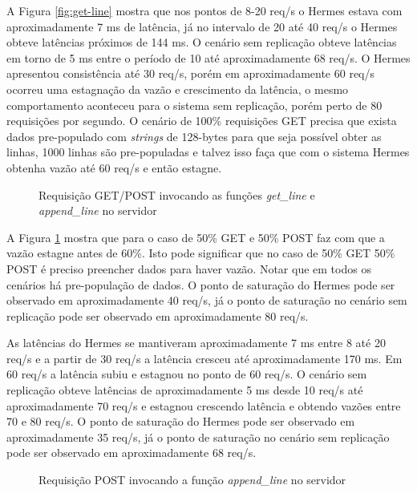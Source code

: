 \documentclass[12pt]{article}
\begin{document}
A Figura \ref{fig:get-line} mostra que nos pontos de 8-20 req/s o Hermes estava com aproximadamente 7 ms de latência, já no intervalo de 20 até 40 req/s o Hermes obteve latências próximos de 144 ms. O cenário sem replicação obteve latências em torno de 5 ms entre o período de 10 até aproximadamente 68 req/s. O Hermes apresentou consistência até 30 req/s, porém em aproximadamente 60 req/s ocorreu uma estagnação da vazão e crescimento da latência, o mesmo comportamento aconteceu para o sistema sem replicação, porém perto de 80 requisições por segundo. O cenário de 100\% requisições GET precisa que exista dados pre-populado com \textit{strings} de 128-bytes para que seja possível obter as linhas, 1000 linhas são pre-populadas e talvez isso faça que com o sistema Hermes obtenha vazão até 60 req/s e então estagne.

\begin{figure}[htb!]
\centering
\caption{Requisição GET/POST invocando as funções \textit{get\_line} e \textit{append\_line} no servidor}

\label{fig:get-append-line}
\end{figure}

A Figura \ref{fig:get-append-line} mostra que para o caso de 50\% GET e 50\% POST faz com que a vazão estagne antes de 60\%. Isto pode significar que no caso de 50\% GET 50\% POST é preciso preencher dados para haver vazão. Notar que em todos os cenários há pre-população de dados. O ponto de saturação do Hermes pode ser observado em aproximadamente 40 req/s, já o ponto de saturação no cenário sem replicação pode ser observado em aproximadamente 80 req/s.

As latências do Hermes se mantiveram aproximadamente 7 ms entre 8 até 20 req/s e a partir de 30 req/s a latência cresceu até aproximadamente 170 ms. Em 60 req/s a latência subiu e estagnou no ponto de 60 req/s. O cenário sem replicação obteve latências de aproximadamente 5 ms desde 10 req/s até aproximadamente 70 req/s e estagnou crescendo latência e obtendo vazões entre 70 e 80 req/s. O ponto de saturação do Hermes pode ser observado em aproximadamente 35 req/s, já o ponto de saturação no cenário sem replicação pode ser observado em aproximadamente 68 req/s.

\pagebreak

\begin{figure}[htb!]
\centering
\caption{Requisição POST invocando a função \textit{append\_line} no servidor}

\label{fig:append-line}
\end{figure}
\end{document}

